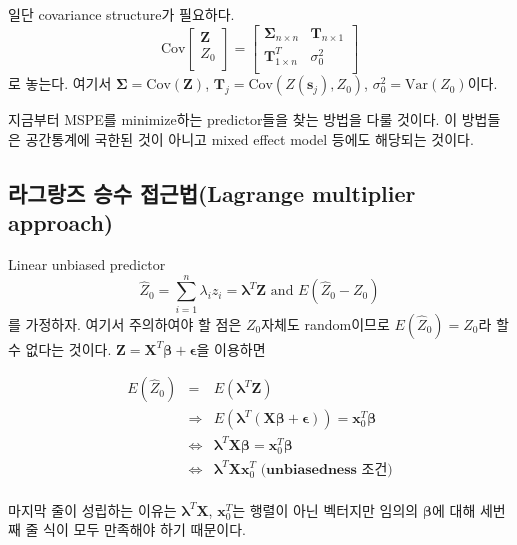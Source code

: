\documentclass[b5paper,]{scrbook}
\theoremstyle{plain}
\theoremstyle{definition}
\numberwithin{equation}{section}
\begin{document}
일단 covariance structure가 필요하다.
\[
\text{Cov}\left[\begin{array}
{r}
\mathbf{Z}\\
Z_{0}\\
\end{array}\right]
=
\left[\begin{array}
{rr}
\boldsymbol{\Sigma}_{n\times n} & \mathbf{T}_{n \times 1}\\
\mathbf{T}_{1\times n}^{T} & \sigma_{0}^{2}\\
\end{array}\right]
\]
로 놓는다. 여기서 \(\boldsymbol{\Sigma}=\text{Cov}(\mathbf{Z})\), \(\mathbf{T}_{j}=\text{Cov}(Z(\mathbf{s}_{j}), Z_{0})\), \(\sigma_{0}^{2}=\text{Var}(Z_{0})\)이다.

지금부터 MSPE를 minimize하는 predictor들을 찾는 방법을 다룰 것이다. 이 방법들은 공간통계에 국한된 것이 아니고 mixed effect model 등에도 해당되는 것이다.

\hypertarget{--lagrange-multiplier-approach}{%
\subsection{라그랑즈 승수 접근법(Lagrange multiplier approach)}\label{--lagrange-multiplier-approach}}

Linear unbiased predictor
\[\hat{Z}_{0}=\sum_{i=1}^{n}\lambda_{i}z_{i}=\boldsymbol{\lambda}^{T}\mathbf{Z} \text{ and } E(\hat{Z}_{0}-Z_{0})\]
를 가정하자. 여기서 주의하여야 할 점은 \(Z_{0}\)자체도 random이므로 \(E(\hat{Z}_{0})=Z_{0}\)라 할 수 없다는 것이다. \(\mathbf{Z}=\boldsymbol{X}^{T}\boldsymbol{\beta}+\boldsymbol{\epsilon}\)을 이용하면

\begin{eqnarray*}
E(\hat{Z}_{0})&=&E(\boldsymbol{\lambda}^{T}\mathbf{Z})\\
&\Longrightarrow& E(\boldsymbol{\lambda}^{T}(\mathbf{X}\boldsymbol{\beta}+\boldsymbol{\epsilon}))=\mathbf{x}_{0}^{T}\boldsymbol{\beta}\\
&\Longleftrightarrow& \boldsymbol{\lambda}^{T}\mathbf{X}\boldsymbol{\beta}=\mathbf{x}_{0}^{T}\boldsymbol{\beta}\\
&\Longleftrightarrow& \boldsymbol{\lambda}^{T}\mathbf{X}\mathbf{x}_{0}^{T} \textbf{ (unbiasedness 조건)}\\
\end{eqnarray*}

마지막 줄이 성립하는 이유는 \(\boldsymbol{\lambda}^{T}\mathbf{X}\), \(\mathbf{x}_{0}^{T}\)는 행렬이 아닌 벡터지만 임의의 \(\boldsymbol{\beta}\)에 대해 세번째 줄 식이 모두 만족해야 하기 때문이다.
\end{document}
